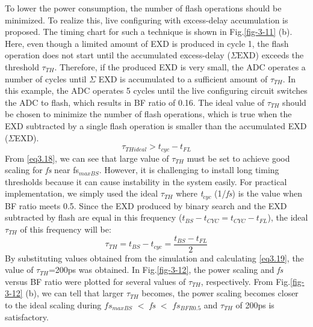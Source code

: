 To lower the power consumption, the number of flash operations should be minimized. To realize this, live configuring with excess-delay accumulation is proposed. The timing chart for such a technique is shown in Fig.\ref{fig-3-11} (b). Here, even though a limited amount of EXD is produced in cycle 1, the flash operation does not start until the accumulated excess-delay ($\Sigma{\mathrm{EXD}}$) exceeds the threshold \textit{$\tau_{TH}$}. Therefore, if the produced EXD is very small, the ADC operates a number of cycles until $\Sigma$ EXD is accumulated to a sufficient amount of \textit{$\tau_{TH}$}.  In this example, the ADC operates 5 cycles until the live configuring circuit switches the ADC to flash, which results in BF ratio of 0.16. The ideal value of \textit{$\tau_{TH}$} should be chosen to minimize the number of flash operations, which is true when the EXD subtracted by a single flash operation is smaller than the accumulated EXD ($\Sigma$EXD).
\begin{equation}
    {\tau }_{THideal} \mathrm{>}t_{cyc}-t_{FL} \label{eq3.18}
\end{equation}
From \eqref{eq3.18}, we can see that large value of \textit{$\tau _{TH}$} must be set to achieve good scaling for \textit{fs} near fs${}_{maxBS}$. However, it is challenging to install long timing thresholds because it can cause instability in the system easily. For practical implementation, we simply used the ideal \textit{$\tau _{TH}$} where \textit{t${}_{cyc}$} (1/\textit{fs}) is the value when BF ratio meets 0.5. Since the EXD produced by binary search and the EXD subtracted by flash are equal in this frequency ($t_{BS}-t_{CYC}=t_{CYC}-t_{FL}$), the ideal \textit{$\tau _{TH}$} of this frequency will be:
\begin{equation}
    {\tau }_{TH}=t_{BS}-t_{cyc}=\frac{t_{BS}-t_{FL}}{2} \label{eq3.19}
\end{equation}
By substituting values obtained from the simulation and calculating \eqref{eq3.19}, the value of \textit{$\tau_{TH}$}=200ps was obtained. In Fig.\ref{fig-3-12}, the power scaling and \textit{fs} versus BF ratio were plotted for several values of \textit{$\tau_{TH}$}, respectively. From Fig.\ref{fig-3-12} (b), we can tell that larger \textit{$\tau_{TH}$} becomes, the power scaling becomes closer to the ideal scaling during \textit{$fs_{maxBS}$} $\mathrm{<}$ \textit{fs} $\mathrm{<}$ \textit{$fs_{BFR0.5}$} and\textit{ $\tau_{TH}$} of 200ps is satisfactory.

